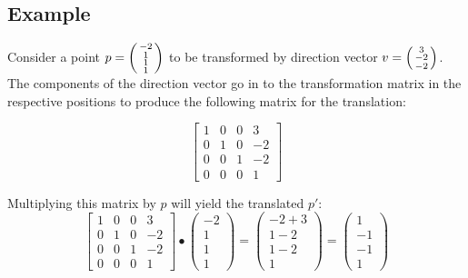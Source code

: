 \documentclass{article}
\begin{document}
	\subsection{Example}
	Consider a point \(p = \begin{psmallmatrix} -2 \\ 1 \\ 1 \\ 1 \end{psmallmatrix}\)
	to be transformed by direction vector \(v = \begin{psmallmatrix} 3 \\ -2 \\ -2 \end{psmallmatrix}\).
	The components of the direction vector go in to the transformation matrix in the respective positions to produce the following matrix for the translation: \par
	\[
		\begin{bmatrix}
			1 & 0 & 0 & 3 \\
			0 & 1 & 0 & -2 \\
			0 & 0 & 1 & -2 \\
			0 & 0 & 0 & 1
		\end{bmatrix}
	\]

	Multiplying this matrix by $p$ will yield the translated $p'$:
	\[
		\begin{bmatrix}
			1 & 0 & 0 & 3 \\
			0 & 1 & 0 & -2 \\
			0 & 0 & 1 & -2 \\
			0 & 0 & 0 & 1
		\end{bmatrix}
		\bullet
		\begin{pmatrix}
			-2 \\
			1 \\
			1 \\
			1
		\end{pmatrix}
		=
		\begin{pmatrix}
			-2 + 3 \\
			1 - 2 \\
			1 - 2 \\
			1
		\end{pmatrix}
		=
		\begin{pmatrix}
			1 \\
			-1 \\
			-1 \\
			1
		\end{pmatrix}
	\]
\end{document}

